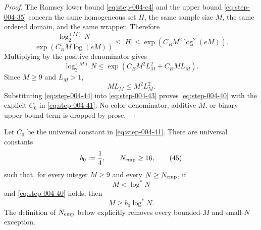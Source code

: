 \begin{proof}

The Ramsey lower bound \eqref{eq:step-004-c4} and the upper bound \eqref{eq:step-004-35} concern the same homogeneous set \(H\), the same sample size \(M\), the same ordered domain, and the same wrapper. Therefore
\[
\frac{\log_2^{(M)}N}{\exp(C_RM\log(eM))}
\le |H|
\le\exp(C_BM^2\log^2(eM)).
\tag{42}\label{eq:step-004-42}
\]
Multiplying by the positive denominator gives
\[
\log_2^{(M)}N
\le\exp\!\left(
C_BM^2L_M^2+C_RML_M
\right).
\tag{43}\label{eq:step-004-43}
\]
Since \(M\ge 9\) and \(L_M>1\),
\[
ML_M\le M^2L_M^2.
\tag{44}\label{eq:step-004-44}
\]
Substituting \eqref{eq:step-004-44} into \eqref{eq:step-004-43} proves \eqref{eq:step-004-40} with the explicit \(C_0\) in \eqref{eq:step-004-41}. No color denominator, additive \(M\), or binary upper-bound term is dropped by prose.

\end{proof}


\begin{lemma}
\label{lem:step-004-logstar-inversion}

Let \(C_0\) be the universal constant in \eqref{eq:step-004-41}. There are universal constants
\[
b_0:=\frac14,
\qquad
N_{\rm emp}\ge16,
\tag{45}\label{eq:step-004-45}
\]
such that, for every integer \(M\ge 9\) and every \(N\ge N_{\rm emp}\), if
\[
M<\log^*N
\tag{46}\label{eq:step-004-46}
\]
and \eqref{eq:step-004-40} holds, then
\[
M\ge b_0\log^*N.
\tag{47}\label{eq:step-004-47}
\]
The definition of \(N_{\rm emp}\) below explicitly removes every bounded-\(M\) and small-\(N\) exception.

\end{lemma}

